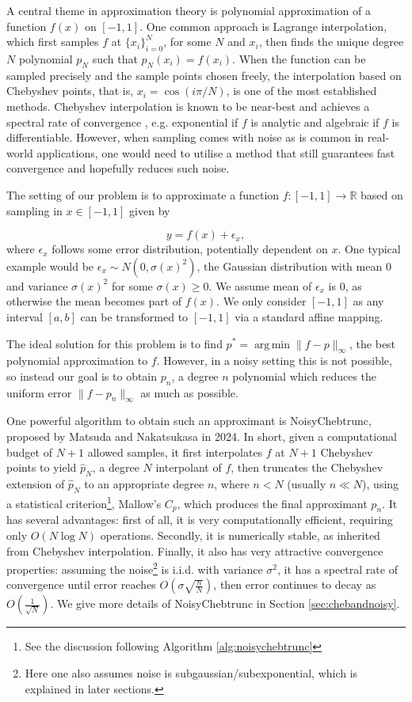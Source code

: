 \documentclass[pdflatex,sn-mathphys-num]{sn-jnl}%
\DeclareMathOperator*{\argmin}{arg\,min}
\theoremstyle{thmstyleone}%
\theoremstyle{thmstyletwo}%
\theoremstyle{thmstylethree}%
\begin{document}
A central theme in approximation theory is polynomial approximation of a function $f(x)$ on $[-1,1]$. One common approach is Lagrange interpolation, which first samples $f$ at $ \{x_i\}_{i=0}^N $, for some $N$ and $x_i$, then finds the unique degree $N$ polynomial $p_N$ such that $p_N(x_i) = f(x_i)$. When the function can be sampled precisely and the sample points chosen freely, the interpolation based on Chebyshev points, that is, $x_i = \cos(i\pi/N)$, is one of the most established methods. Chebyshev interpolation is known to be near-best and achieves a spectral rate of convergence \cite[Chap. 7, 8, 16]{ATAP}, e.g. exponential if $f$ is analytic and algebraic if $f$ is differentiable. However, when sampling comes with noise as is common in real-world applications, one would need to utilise a method that still guarantees fast convergence and hopefully reduces such noise. 

The setting of our problem is to approximate a function $f:[-1,1] \rightarrow \mathbb{R}$ based on sampling in $x \in [-1,1]$ given by

\[y = f(x) + \epsilon_x,\]
where $\epsilon_x$ follows some error distribution, potentially dependent on $x$. One typical example would be $\epsilon_x \sim N(0, \sigma(x)^2)$, the Gaussian distribution with mean $ 0 $ and variance $\sigma(x)^2$ for some $\sigma(x)\geq 0$. We assume mean of $\epsilon_x$ is 0, as otherwise the mean becomes part of $f(x)$. We only consider $[-1,1]$ as any interval $[a,b]$ can be transformed to $[-1,1]$ via a standard affine mapping. 

The ideal solution for this problem is to find $p^* = \argmin \| f - p \|_\infty$, the best polynomial approximation to $f$. However, in a noisy setting this is not possible, so instead our goal is to obtain $p_n$, a degree $n$ polynomial which reduces the uniform error $\|f-p_n\|_\infty$ as much as possible. 


One powerful algorithm to obtain such an approximant is NoisyChebtrunc, proposed by Matsuda and Nakatsukasa \cite{yuji} in 2024. In short, given a computational budget of $N+1$ allowed samples, it first interpolates $f$ at $N+1$ Chebyshev points to yield $\hat{p}_N$, a degree $N$ interpolant of $f$, then truncates the Chebyshev extension of $\hat{p}_N$ to an appropriate degree $n$, where $n<N$ (usually $n\ll N$), using a statistical criterion\footnote{See the discussion following Algorithm \ref{alg:noisychebtrunc}}, Mallow's $C_p$, which produces the final approximant $p_n$. It has several advantages: first of all, it is very computationally efficient, requiring only $O(N\log N)$ operations. Secondly, it is numerically stable, as inherited from Chebyshev interpolation. Finally, it also has very attractive convergence properties: assuming the noise\footnote{Here one also assumes noise is subgaussian/subexponential, which is explained in later sections.} is i.i.d. with variance $\sigma^2$, it has a spectral rate of convergence until error reaches $O(\sigma\sqrt{\frac{n}{N}})$, then error continues to decay as $O(\frac{1}{\sqrt{N}})$. We give more details of NoisyChebtrunc in Section \ref{sec:chebandnoisy}. 
\end{document}
